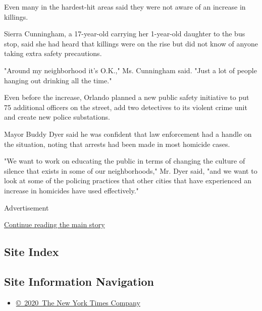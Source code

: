 Even many in the hardest-hit areas said they were not aware of an
increase in killings.

Sierra Cunningham, a 17-year-old carrying her 1-year-old daughter to the
bus stop, said she had heard that killings were on the rise but did not
know of anyone taking extra safety precautions.

"Around my neighborhood it's O.K.," Ms. Cunningham said. "Just a lot of
people hanging out drinking all the time."

Even before the increase, Orlando planned a new public safety initiative
to put 75 additional officers on the street, add two detectives to its
violent crime unit and create new police substations.

Mayor Buddy Dyer said he was confident that law enforcement had a handle
on the situation, noting that arrests had been made in most homicide
cases.

"We want to work on educating the public in terms of changing the
culture of silence that exists in some of our neighborhoods," Mr. Dyer
said, "and we want to look at some of the policing practices that other
cities that have experienced an increase in homicides have used
effectively."

Advertisement

\protect\hyperlink{after-bottom}{Continue reading the main story}

\hypertarget{site-index}{%
\subsection{Site Index}\label{site-index}}

\hypertarget{site-information-navigation}{%
\subsection{Site Information
Navigation}\label{site-information-navigation}}

\begin{itemize}
\tightlist
\item
  \href{https://help.nytimes3xbfgragh.onion/hc/en-us/articles/115014792127-Copyright-notice}{©~2020~The
  New York Times Company}
\end{itemize}

